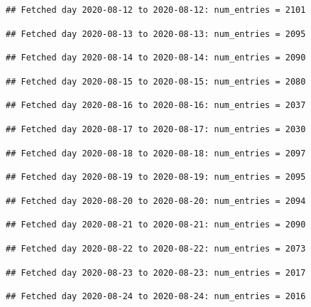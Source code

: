 \documentclass[]{article}
\begin{document}
\begin{verbatim}
## Fetched day 2020-08-12 to 2020-08-12: num_entries = 2101
\end{verbatim}

\begin{verbatim}
## Fetched day 2020-08-13 to 2020-08-13: num_entries = 2095
\end{verbatim}

\begin{verbatim}
## Fetched day 2020-08-14 to 2020-08-14: num_entries = 2090
\end{verbatim}

\begin{verbatim}
## Fetched day 2020-08-15 to 2020-08-15: num_entries = 2080
\end{verbatim}

\begin{verbatim}
## Fetched day 2020-08-16 to 2020-08-16: num_entries = 2037
\end{verbatim}

\begin{verbatim}
## Fetched day 2020-08-17 to 2020-08-17: num_entries = 2030
\end{verbatim}

\begin{verbatim}
## Fetched day 2020-08-18 to 2020-08-18: num_entries = 2097
\end{verbatim}

\begin{verbatim}
## Fetched day 2020-08-19 to 2020-08-19: num_entries = 2095
\end{verbatim}

\begin{verbatim}
## Fetched day 2020-08-20 to 2020-08-20: num_entries = 2094
\end{verbatim}

\begin{verbatim}
## Fetched day 2020-08-21 to 2020-08-21: num_entries = 2090
\end{verbatim}

\begin{verbatim}
## Fetched day 2020-08-22 to 2020-08-22: num_entries = 2073
\end{verbatim}

\begin{verbatim}
## Fetched day 2020-08-23 to 2020-08-23: num_entries = 2017
\end{verbatim}

\begin{verbatim}
## Fetched day 2020-08-24 to 2020-08-24: num_entries = 2016
\end{verbatim}
\end{document}

